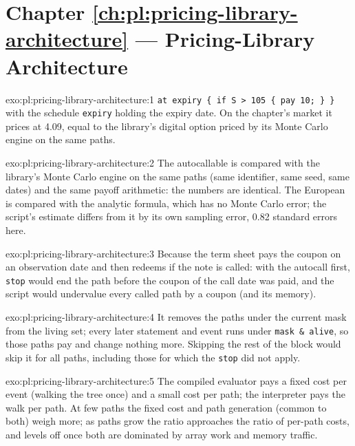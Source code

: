 \section*{Chapter \ref{ch:pl:pricing-library-architecture} --- Pricing-Library Architecture}

\begin{solution}{exo:pl:pricing-library-architecture:1}
\texttt{at expiry \{ if S > 105 \{ pay 10; \} \}} with the schedule \texttt{expiry} holding the expiry date. On the chapter's market it prices at
4.09, equal to the library's digital option priced by its Monte Carlo engine on the same paths.
\end{solution}

\begin{solution}{exo:pl:pricing-library-architecture:2}
The autocallable is compared with the library's Monte Carlo engine on the same paths (same identifier, same seed, same dates) and the same
payoff arithmetic: the numbers are identical. The European is compared with the analytic formula, which has no Monte Carlo error; the script's
estimate differs from it by its own sampling error, 0.82 standard errors here.
\end{solution}

\begin{solution}{exo:pl:pricing-library-architecture:3}
Because the term sheet pays the coupon on an observation date and then redeems if the note is called: with the autocall first, \texttt{stop}
would end the path before the coupon of the call date was paid, and the script would undervalue every called path by a coupon (and its memory).
\end{solution}

\begin{solution}{exo:pl:pricing-library-architecture:4}
It removes the paths under the current mask from the living set; every later statement and event runs under \texttt{mask \& alive}, so those
paths pay and change nothing more. Skipping the rest of the block would skip it for all paths, including those for which the \texttt{stop} did
not apply.
\end{solution}

\begin{solution}{exo:pl:pricing-library-architecture:5}
The compiled evaluator pays a fixed cost per event (walking the tree once) and a small cost per path; the interpreter pays the walk per path. At
few paths the fixed cost and path generation (common to both) weigh more; as paths grow the ratio approaches the ratio of per-path costs, and
levels off once both are dominated by array work and memory traffic.
\end{solution}

